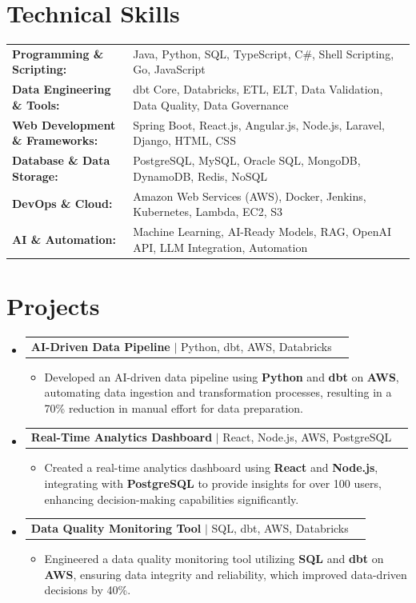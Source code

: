 \documentclass[letterpaper,10pt]{article}
\makeatletter
\newcommand{\resumeItem}[1]{
  \item{\fontsize{8pt}{9pt}\selectfont
    #1 \vspace{-3pt}
  }
}
\newcommand{\resumeProjectHeading}[2]{
    \item
    \begin{tabular*}{1.001\textwidth}{l@{\extracolsep{\fill}}r}
      \fontsize{8.5pt}{10pt}#1 & \textbf{\fontsize{8.5pt}{10pt} #2}\\
    \end{tabular*}\vspace{-7pt}
}
\newcommand{\resumeSubHeadingListStart}{\begin{itemize}[leftmargin=0pt, label={}]}
\newcommand{\resumeSubHeadingListEnd}{\end{itemize}}
\newcommand{\resumeItemListStart}{\begin{itemize}[leftmargin=*]}
\newcommand{\resumeItemListEnd}{\end{itemize}\vspace{-5pt}}
\makeatother
\begin{document}
\section{Technical Skills}
        \vspace{-14pt}
        \begin{table}[h]
            \fontsize{8pt}{9pt}\selectfont
            \begin{tabular}{p{0.3\linewidth} p{0.7\linewidth}}
                \textbf{Programming \& Scripting:} & Java, Python, SQL, TypeScript, C\#, Shell Scripting, Go, JavaScript \\
                \textbf{Data Engineering \& Tools:} & dbt Core, Databricks, ETL, ELT, Data Validation, Data Quality, Data Governance \\
                \textbf{Web Development \& Frameworks:} & Spring Boot, React.js, Angular.js, Node.js, Laravel, Django, HTML, CSS \\
                \textbf{Database \& Data Storage:} & PostgreSQL, MySQL, Oracle SQL, MongoDB, DynamoDB, Redis, NoSQL \\
                \textbf{DevOps \& Cloud:} & Amazon Web Services (AWS), Docker, Jenkins, Kubernetes, Lambda, EC2, S3 \\
                \textbf{AI \& Automation:} & Machine Learning, AI-Ready Models, RAG, OpenAI API, LLM Integration, Automation \\
            \end{tabular}
        \end{table}
 \vspace{-18pt}

\section{Projects}
    \vspace{-5pt}
    \resumeSubHeadingListStart
          \resumeProjectHeading
            {\textbf{AI-Driven Data Pipeline} $|$ Python, dbt, AWS, Databricks}{}
            \resumeItemListStart
                \resumeItem{Developed an AI-driven data pipeline using \textbf{Python} and \textbf{dbt} on \textbf{AWS}, automating data ingestion and transformation processes, resulting in a 70\% reduction in manual effort for data preparation.}
            \resumeItemListEnd
        \vspace{-12pt}
    
        \resumeProjectHeading
            {\textbf{Real-Time Analytics Dashboard} $|$ React, Node.js, AWS, PostgreSQL}{}
        \resumeItemListStart
                \resumeItem{Created a real-time analytics dashboard using \textbf{React} and \textbf{Node.js}, integrating with \textbf{PostgreSQL} to provide insights for over 100 users, enhancing decision-making capabilities significantly.}
        \resumeItemListEnd
      \vspace{-12pt}
      \resumeProjectHeading
        {\textbf{Data Quality Monitoring Tool} $|$ SQL, dbt, AWS, Databricks}{}
    \resumeItemListStart
            \resumeItem{Engineered a data quality monitoring tool utilizing \textbf{SQL} and \textbf{dbt} on \textbf{AWS}, ensuring data integrity and reliability, which improved data-driven decisions by 40\%.}
    \resumeItemListEnd
    \resumeSubHeadingListEnd
\end{document}
